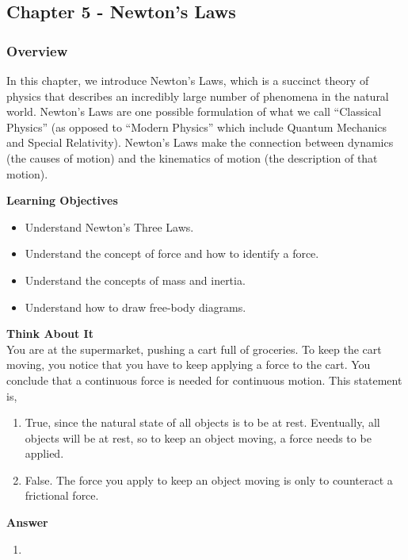 \subsection{Chapter 5 - Newton's Laws}

\subsubsection{Overview}\label{chap:NewtonsLaws}

In this chapter, we introduce Newton's Laws, which is a succinct theory of physics that describes an incredibly large number of phenomena in the natural world. Newton's Laws are one possible formulation of what we call ``Classical Physics'' (as opposed to ``Modern Physics'' which include Quantum Mechanics and Special Relativity). Newton's Laws make the connection between dynamics (the causes of motion) and the kinematics of motion (the description of that motion).

\begin{framed}
\textbf{Learning Objectives}\\
\begin{itemize}
\item Understand Newton's Three Laws.
\item Understand the concept of force and how to identify a force.
\item Understand the concepts of mass and inertia.
\item Understand how to draw free-body diagrams.
\end{itemize}
\end{framed}

\begin{framed}
\textbf{Think About It}\\
You are at the supermarket, pushing a cart full of groceries. To keep the cart moving, you notice that you have to keep applying a force to the cart. You conclude that a continuous force is needed for continuous motion. This statement is,

\begin{enumerate}
\item True, since the natural state of all objects is to be at rest. Eventually, all objects will be at rest, so to keep an object moving, a force needs to be applied.
\item False. The force you apply to keep an object moving is only to counteract a frictional force.
\end{enumerate}

\begin{framed}
\textbf{Answer}\\
\begin{enumerate}
\item
\end{enumerate}
\end{framed}
\end{framed}

